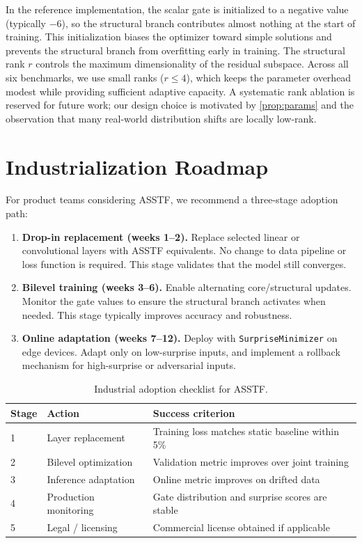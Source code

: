 \documentclass[11pt,a4paper]{article}
\theoremstyle{definition}
\begin{document}
In the reference implementation, the scalar gate is initialized to a negative value (typically $-6$), so the structural branch contributes almost nothing at the start of training. This initialization biases the optimizer toward simple solutions and prevents the structural branch from overfitting early in training. The structural rank $r$ controls the maximum dimensionality of the residual subspace. Across all six benchmarks, we use small ranks ($r \le 4$), which keeps the parameter overhead modest while providing sufficient adaptive capacity. A systematic rank ablation is reserved for future work; our design choice is motivated by \cref{prop:params} and the observation that many real-world distribution shifts are locally low-rank.

\section{Industrialization Roadmap}
\label{sec:industrial}

For product teams considering ASSTF, we recommend a three-stage adoption path:

\begin{enumerate}
    \item \textbf{Drop-in replacement (weeks 1--2).} Replace selected linear or convolutional layers with ASSTF equivalents. No change to data pipeline or loss function is required. This stage validates that the model still converges.
    
    \item \textbf{Bilevel training (weeks 3--6).} Enable alternating core/structural updates. Monitor the gate values to ensure the structural branch activates when needed. This stage typically improves accuracy and robustness.
    
    \item \textbf{Online adaptation (weeks 7--12).} Deploy with \texttt{SurpriseMinimizer} on edge devices. Adapt only on low-surprise inputs, and implement a rollback mechanism for high-surprise or adversarial inputs.
\end{enumerate}

\begin{table}[t]
\centering
\caption{Industrial adoption checklist for ASSTF.}
\label{tab:checklist}
\begin{tabular}{@{}llp{6cm}@{}}
\toprule
\textbf{Stage} & \textbf{Action} & \textbf{Success criterion} \\
\midrule
1 & Layer replacement & Training loss matches static baseline within 5\% \\
2 & Bilevel optimization & Validation metric improves over joint training \\
3 & Inference adaptation & Online metric improves on drifted data \\
4 & Production monitoring & Gate distribution and surprise scores are stable \\
5 & Legal / licensing & Commercial license obtained if applicable \\
\bottomrule
\end{tabular}
\end{table}
\end{document}
